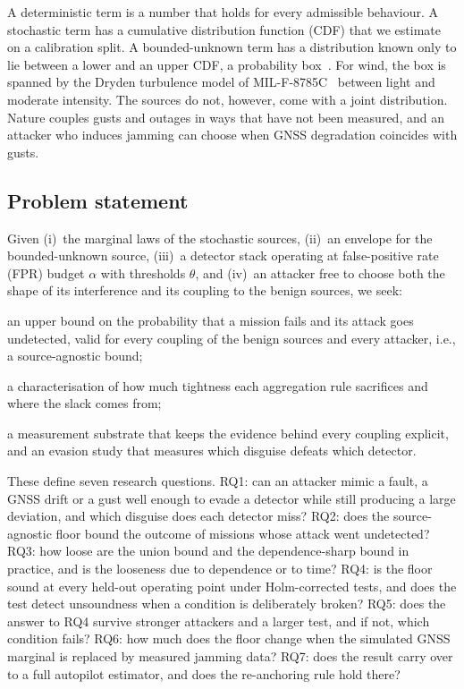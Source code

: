 \documentclass[letterpaper,twocolumn,10pt]{article}
\theoremstyle{remark}
\begin{document}
\noindent
A deterministic term is a number that holds for every admissible behaviour. A
stochastic term has a cumulative distribution function (CDF) that we estimate
on a calibration split. A bounded-unknown term has a distribution known only to
lie between a lower and an upper CDF, a probability box~\cite{ferson2003}. For
wind, the box is spanned by the Dryden turbulence model of
MIL-F-8785C~\cite{milf8785c} between light and moderate intensity. The sources
do not, however, come with a joint distribution. Nature couples gusts and
outages in ways that have not been measured, and an attacker who induces
jamming can choose when GNSS degradation coincides with gusts.

\subsection{Problem statement}
Given (i)~the marginal laws of the stochastic sources, (ii)~an envelope for the
bounded-unknown source, (iii)~a detector stack operating at false-positive
rate (FPR) budget $\alpha$ with thresholds $\theta$, and (iv)~an attacker free
to choose both the shape of its interference and its coupling to the benign
sources, we seek:
\begin{description}[leftmargin=1.6em,style=sameline]
\item[P1] an upper bound on the probability that a mission fails
  and its attack goes undetected, valid for every coupling of the benign
  sources and every attacker, i.e., a source-agnostic bound;
\item[P2] a characterisation of how much tightness each aggregation rule
  sacrifices and where the slack comes from;
\item[P3] a measurement substrate that keeps the evidence behind every coupling
  explicit, and an evasion study that measures which disguise defeats which
  detector.
\end{description}
\noindent These define seven research questions. RQ1: can an attacker mimic a
fault, a GNSS drift or a gust well enough to evade a detector while still
producing a large deviation, and which disguise does each detector miss? RQ2:
does the source-agnostic floor bound the outcome of missions whose attack went
undetected? RQ3: how loose are the union bound and the dependence-sharp bound in
practice, and is the looseness due to dependence or to time? RQ4: is the floor
sound at every held-out operating point under Holm-corrected tests, and does the
test detect unsoundness when a condition is deliberately broken? RQ5: does the
answer to RQ4 survive stronger attackers and a larger test, and if not, which
condition fails? RQ6: how much does the floor change when the simulated GNSS
marginal is replaced by measured jamming data? RQ7: does the result carry over to a full
autopilot estimator, and does the re-anchoring rule hold there?
\end{document}
